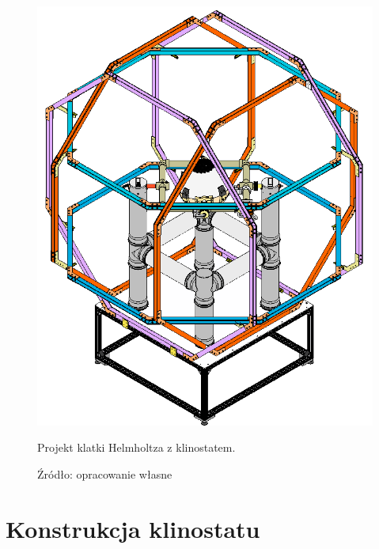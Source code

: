 \begin{figure}
	\centering
	\includegraphics[scale=0.5]{klinostat_klatka}
	\caption{Projekt klatki Helmholtza z klinostatem.} 
	\caption*{Źródło: opracowanie własne}
	\label{fig:klatka_helmholtza}
\end{figure}

\section{Konstrukcja klinostatu}

